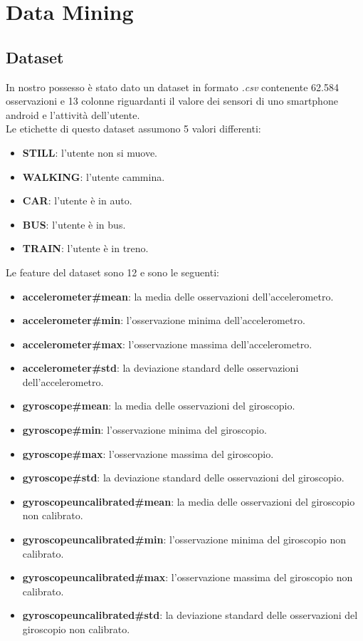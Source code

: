 \documentclass[../../Report.tex]{subfiles}
\begin{document}
\chapter{Data Mining}
\section{Dataset}
In nostro possesso è stato dato un dataset in formato \emph{.csv} contenente 62.584 osservazioni e 13 colonne riguardanti il valore dei sensori di uno smartphone android e l'attività dell'utente.\\
Le etichette di questo dataset assumono 5 valori differenti:
\begin{itemize}
    \item \textbf{STILL}: l'utente non si muove.
    \item \textbf{WALKING}: l'utente cammina.
    \item \textbf{CAR}: l'utente è in auto.
    \item \textbf{BUS}: l'utente è in bus.
    \item \textbf{TRAIN}: l'utente è in treno. 
\end{itemize}
Le feature del dataset sono 12 e sono le seguenti:
\begin{itemize}
    \item \textbf{accelerometer\#mean}: la media delle osservazioni dell'accelerometro.
    \item \textbf{accelerometer\#min}: l'osservazione minima dell'accelerometro.
    \item \textbf{accelerometer\#max}: l'osservazione massima dell'accelerometro.
    \item \textbf{accelerometer\#std}: la deviazione standard delle osservazioni dell'accelerometro.
    \item \textbf{gyroscope\#mean}: la media delle osservazioni del giroscopio.
    \item \textbf{gyroscope\#min}:  l'osservazione minima del giroscopio.
    \item \textbf{gyroscope\#max}:  l'osservazione massima del giroscopio.
    \item \textbf{gyroscope\#std}: la deviazione standard delle osservazioni del giroscopio.
    \item \textbf{gyroscopeuncalibrated\#mean}: la media delle osservazioni del giroscopio non calibrato.
    \item \textbf{gyroscopeuncalibrated\#min}:  l'osservazione minima del giroscopio non calibrato.
    \item \textbf{gyroscopeuncalibrated\#max}: l'osservazione massima del giroscopio non calibrato.
    \item \textbf{gyroscopeuncalibrated\#std}: la deviazione standard delle osservazioni del giroscopio non calibrato.
\end{itemize}
\end{document}
